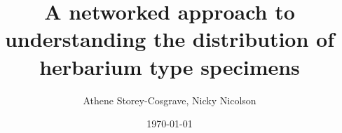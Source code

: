 \title
[Botanical University Challenge - Student Conference] %
{ %
A networked approach to understanding the distribution of herbarium type specimens
}

\author{ %
Athene Storey-Cosgrave, Nicky Nicolson
}
\date{\today}
